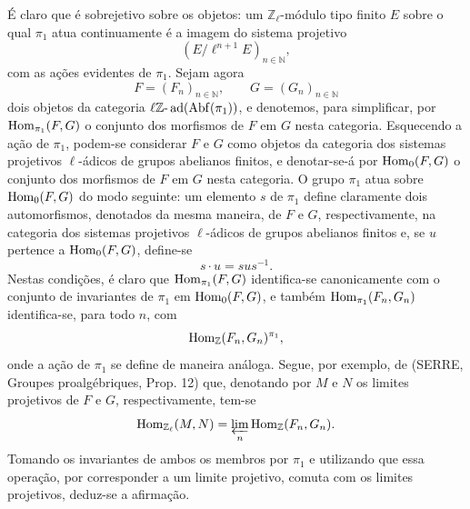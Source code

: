 \begin{prooftext}[Demonstração]
É claro que é sobrejetivo sobre os objetos: um \(\mathbb Z_\ell\)-módulo tipo finito \(E\) sobre o qual \(\pi_1\) atua continuamente é a imagem do sistema projetivo
\[
(E/\ell^{n+1}E)_{n\in\mathbb N},
\]
com as ações evidentes de \(\pi_1\). Sejam agora
\[
F=(F_n)_{n\in\mathbb N},\qquad G=(G_n)_{n\in\mathbb N}
\]
dois objetos da categoria \(\ell\mathbb Z\text{-}\operatorname{ad}(\operatorname{Abf}(\pi_1))\), e denotemos, para simplificar, por \(\operatorname{Hom}_{\pi_1}(F,G)\) o conjunto dos morfismos de \(F\) em \(G\) nesta categoria. Esquecendo a ação de \(\pi_1\), podem-se considerar \(F\) e \(G\) como objetos da categoria dos sistemas projetivos \(\ell\)-ádicos de grupos abelianos finitos, e denotar-se-á por \(\operatorname{Hom}_0(F,G)\) o conjunto dos morfismos de \(F\) em \(G\) nesta categoria. O grupo \(\pi_1\) atua sobre \(\operatorname{Hom}_0(F,G)\) do modo seguinte: um elemento \(s\) de \(\pi_1\) define claramente dois automorfismos, denotados da mesma maneira, de \(F\) e \(G\), respectivamente, na categoria dos sistemas projetivos \(\ell\)-ádicos de grupos abelianos finitos e, se \(u\) pertence a \(\operatorname{Hom}_0(F,G)\), define-se
\[
s\cdot u=sus^{-1}.
\]
Nestas condições, é claro que \(\operatorname{Hom}_{\pi_1}(F,G)\) identifica-se canonicamente com o conjunto de invariantes de \(\pi_1\) em \(\operatorname{Hom}_0(F,G)\), e também \(\operatorname{Hom}_{\pi_1}(F_n,G_n)\) identifica-se, para todo \(n\), com
\[
\operatorname{Hom}_{\mathbb Z}(F_n,G_n)^{\pi_1},
\]
onde a ação de \(\pi_1\) se define de maneira análoga. Segue, por exemplo, de (SERRE, Groupes proalgébriques, Prop. 12) que, denotando por \(M\) e \(N\) os limites projetivos de \(F\) e \(G\), respectivamente, tem-se
\[
\operatorname{Hom}_{\mathbb Z_\ell}(M,N)=\varprojlim_n\operatorname{Hom}_{\mathbb Z}(F_n,G_n).
\]
Tomando os invariantes de ambos os membros por \(\pi_1\) e utilizando que essa operação, por corresponder a um limite projetivo, comuta com os limites projetivos, deduz-se a afirmação.
\end{prooftext}
